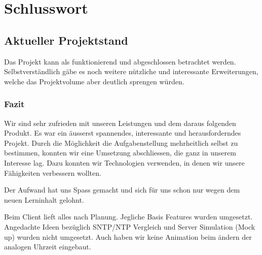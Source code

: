 
\chapter{Schlusswort}
\label{chap:Schlusswort}
\section{Aktueller Projektstand}
Das Projekt kann als funktionierend und abgeschlossen betrachtet werden. Selbstverständlich gäbe es noch weitere nützliche und interessante Erweiterungen, welche das Projektvolume aber deutlich sprengen würden.

\subsection{Fazit}
Wir sind sehr zufrieden mit unseren Leistungen und dem daraus folgenden Produkt. Es war ein äusserst spannendes, interessante und herausforderndes Projekt. Durch die Möglichkeit die Aufgabenstellung mehrheitlich selbst zu bestimmen, konnten wir eine Umsetzung abschliessen, die ganz in unserem Interesse lag. Dazu konnten wir Technologien verwenden, in denen wir unsere Fähigkeiten verbessern wollten.

Der Aufwand hat uns Spass gemacht und sich für uns schon nur wegen dem neuen Lerninhalt gelohnt.


Beim Client lieft alles nach Planung. Jegliche Basis Features wurden umgesetzt. Angedachte Ideen bezüglich SNTP/NTP Vergleich und Server Simulation (Mock up) wurden nicht umgesetzt. Auch haben wir keine Animation beim ändern der analogen Uhrzeit eingebaut.





